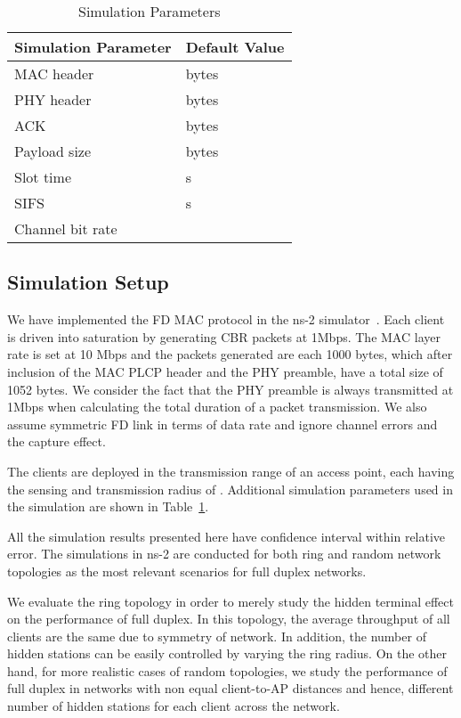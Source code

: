 \documentclass[10pt,journal,cspaper,compsoc]{IEEEtran}
\begin{document}
\begin{table}[!t]
\renewcommand{\arraystretch}{1.2}
\caption{Simulation Parameters}
\label{tab:dcfparam}
\centering
\begin{tabular}{l||l}
\hline
\bfseries Simulation Parameter & \bfseries Default Value\\
\hline\hline
MAC header &   bytes  \\
PHY header &  bytes  \\
ACK &  bytes \\
Payload size &  bytes \\
Slot time &   s  \\
SIFS &  s  \\
Channel bit rate &  \\
\hline
\end{tabular}
\end{table}


\subsection{Simulation Setup}

We have implemented the FD MAC protocol in the ns-2 simulator~\cite{ns2}. Each client is driven into saturation by generating CBR packets at 1Mbps. The MAC layer rate is set at 10 Mbps and the packets generated are each 1000 bytes, which after inclusion of the MAC PLCP header and the PHY preamble, have a total size of 1052 bytes. We consider the fact that the PHY preamble is always transmitted at 1Mbps when calculating the total duration of a packet transmission. We also assume symmetric FD link in terms of data rate and ignore channel errors and the capture effect.

The clients are deployed in the transmission range of an access point, each having the sensing and transmission radius of . Additional simulation parameters used in the simulation are shown in Table~\ref{tab:dcfparam}.

All the simulation results presented here have  confidence interval within  relative error. The simulations in ns-2 are conducted for both ring and random network topologies as the most relevant scenarios for full duplex networks.

We evaluate the ring topology in order to merely study the hidden terminal effect on the performance of full duplex. In this topology, the average throughput of all clients are the same due to symmetry of network. In addition, the number of hidden stations can be easily controlled by varying the ring radius.
On the other hand, for more realistic cases of random topologies, we study the performance of full duplex in networks with non equal client-to-AP distances and hence, different number of hidden stations for each client across the network. 
\end{document}
